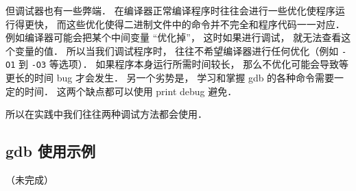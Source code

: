 但调试器也有一些弊端． 在编译器正常编译程序时往往会进行一些优化使程序运行得更快， 而这些优化使得二进制文件中的命令并不完全和程序代码一一对应． 例如编译器可能会把某个中间变量 “优化掉”， 这时如果进行调试， 就无法查看这个变量的值． 所以当我们调试程序时， 往往不希望编译器进行任何优化（例如 \verb|-O1| 到 \verb|-O3| 等选项）． 如果程序本身运行所需时间较长， 那么不优化可能会导致等更长的时间 bug 才会发生． 另一个劣势是， 学习和掌握 gdb 的各种命令需要一定的时间． 这两个缺点都可以使用 print debug 避免．

所以在实践中我们往往两种调试方法都会使用．

\subsection{gdb 使用示例}

（未完成）
